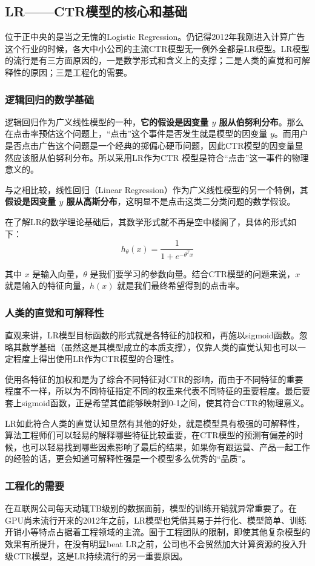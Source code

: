 \documentclass[12pt]{article}
\begin{document}
\subsection{LR——CTR模型的核心和基础}
位于正中央的是当之无愧的Logistic Regression。仍记得2012年我刚进入计算广告这个行业的时候，各大中小公司的主流CTR模型无一例外全都是LR模型。LR模型的流行是有三方面原因的，一是数学形式和含义上的支撑；二是人类的直觉和可解释性的原因；三是工程化的需要。

\subsubsection{逻辑回归的数学基础}
逻辑回归作为广义线性模型的一种，\textbf{它的假设是因变量 $y$ 服从伯努利分布}。那么在点击率预估这个问题上，“点击”这个事件是否发生就是模型的因变量 $y$。而用户是否点击广告这个问题是一个经典的掷偏心硬币问题，因此CTR模型的因变量显然应该服从伯努利分布。所以采用LR作为CTR 模型是符合“点击”这一事件的物理意义的。

与之相比较，线性回归（Linear Regression）作为广义线性模型的另一个特例，其\textbf{假设是因变量 $y$ 服从高斯分布}，这明显不是点击这类二分类问题的数学假设。

在了解LR的数学理论基础后，其数学形式就不再是空中楼阁了，具体的形式如下：
$$
h_\theta(x) = \frac{1}{1 + e^{-\theta^Tx}}
$$

其中 $x$ 是输入向量，$\theta$ 是我们要学习的参数向量。结合CTR模型的问题来说，$x$ 就是输入的特征向量，$h(x)$ 就是我们最终希望得到的点击率。

\subsubsection{人类的直觉和可解释性}
直观来讲，LR模型目标函数的形式就是各特征的加权和，再施以sigmoid函数。忽略其数学基础（虽然这是其模型成立的本质支撑），仅靠人类的直觉认知也可以一定程度上得出使用LR作为CTR模型的合理性。

使用各特征的加权和是为了综合不同特征对CTR的影响，而由于不同特征的重要程度不一样，所以为不同特征指定不同的权重来代表不同特征的重要程度。最后要套上sigmoid函数，正是希望其值能够映射到0-1之间，使其符合CTR的物理意义。

LR如此符合人类的直觉认知显然有其他的好处，就是模型具有极强的可解释性，算法工程师们可以轻易的解释哪些特征比较重要，在CTR模型的预测有偏差的时候，也可以轻易找到哪些因素影响了最后的结果，如果你有跟运营、产品一起工作的经验的话，更会知道可解释性强是一个模型多么优秀的“品质”。

\subsubsection{工程化的需要}
在互联网公司每天动辄TB级别的数据面前，模型的训练开销就异常重要了。在GPU尚未流行开来的2012年之前，LR模型也凭借其易于并行化、模型简单、训练开销小等特点占据着工程领域的主流。囿于工程团队的限制，即使其他复杂模型的效果有所提升，在没有明显beat LR之前，公司也不会贸然加大计算资源的投入升级CTR模型，这是LR持续流行的另一重要原因。
\end{document}
